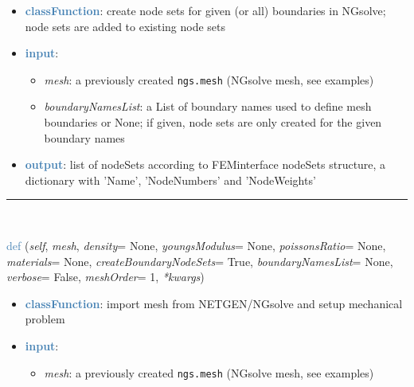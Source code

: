 \begin{itemize}[leftmargin=1.4cm]
\begin{itemize}[leftmargin=1.4cm]
\begin{itemize}[leftmargin=1.4cm]
\begin{itemize}[leftmargin=0.5cm]
\begin{itemize}[leftmargin=1.4cm]
\begin{itemize}[leftmargin=1.4cm]
\begin{itemize}[leftmargin=1.4cm]
\begin{itemize}[leftmargin=0.5cm]
\begin{flushleft}
\end{flushleft}
\setlength{\itemindent}{0.7cm}
\begin{itemize}[leftmargin=0.7cm]
\item[--]\textcolor{steelblue}{\bf classFunction}: create node sets for given (or all) boundaries in NGsolve; node sets are added to existing node sets
\item[--]\textcolor{steelblue}{\bf input}: \vspace{-6pt}
\begin{itemize}[leftmargin=1.2cm]
\setlength{\itemindent}{-0.7cm}
\item[]{\it mesh}: a previously created \texttt{ngs.mesh} (NGsolve mesh, see examples)
\item[]{\it boundaryNamesList}: a List of boundary names used to define mesh boundaries or None; if given, node sets are only created for the given boundary names
\end{itemize}
\item[--]\textcolor{steelblue}{\bf output}: list of nodeSets according to FEMinterface nodeSets structure, a dictionary with 'Name', 'NodeNumbers' and 'NodeWeights'
\vspace{12pt}\end{itemize}
%
\noindent\rule{8cm}{0.75pt}\vspace{1pt} \\ 
\begin{flushleft}
\noindent \textcolor{steelblue}{def {\bf {}}}\label{sec:FEM:FEMinterface:ImportMeshFromNGsolve}
({\it self}, {\it mesh}, {\it density}= None, {\it youngsModulus}= None, {\it poissonsRatio}= None, {\it materials}= None, {\it createBoundaryNodeSets}= True, {\it boundaryNamesList}= None, {\it verbose}= False, {\it meshOrder}= 1, {\it **kwargs})
\end{flushleft}
\setlength{\itemindent}{0.7cm}
\begin{itemize}[leftmargin=0.7cm]
\item[--]\textcolor{steelblue}{\bf classFunction}: import mesh from NETGEN/NGsolve and setup mechanical problem
\item[--]\textcolor{steelblue}{\bf input}: \vspace{-6pt}
\begin{itemize}[leftmargin=1.2cm]
\setlength{\itemindent}{-0.7cm}
\item[]{\it mesh}: a previously created \texttt{ngs.mesh} (NGsolve mesh, see examples)

\end{itemize}
\end{itemize}
\end{itemize}
\end{itemize}
\end{itemize}
\end{itemize}
\end{itemize}
\end{itemize}
\end{itemize}
\end{itemize}
